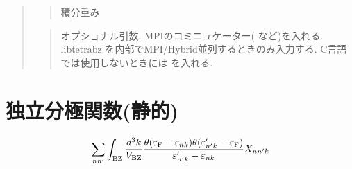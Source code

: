 \documentclass[letterpaper,10pt,dvipdfmx,openany]{sphinxmanual}
\begin{document}
\begin{quote}
\begin{quote}
\sphinxAtStartPar
積分重み
\end{quote}

\begin{sphinxVerbatim}[commandchars=\\\{\}]
\end{sphinxVerbatim}
\begin{quote}

\sphinxAtStartPar
オプショナル引数.
MPIのコミニュケーター(  など)を入れる.
libtetrabz を内部でMPI/Hybrid並列するときのみ入力する.
C言語では使用しないときには  を入れる.
\end{quote}
\end{quote}


\section{独立分極関数(静的)}
\label{\detokenize{routine:id5}}\begin{equation*}
\begin{split}\begin{align}
\sum_{n n'}
\int_{\rm BZ} \frac{d^3 k}{V_{\rm BZ}}
\frac{\theta(\varepsilon_{\rm F} - \varepsilon_{n k})
\theta(\varepsilon'_{n' k} - \varepsilon_{\rm F})}
{\varepsilon'_{n' k} - \varepsilon_{n k}}
X_{n n' k}
\end{align}\end{split}
\end{equation*}
\begin{sphinxVerbatim}[commandchars=\\\{\}]
\end{sphinxVerbatim}
\end{document}
